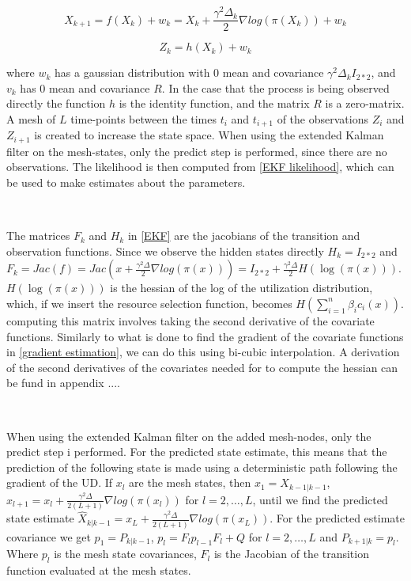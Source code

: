 $$X_{k+1} = f(X_k) + w_k = X_k + \frac{\gamma^2\Delta_k}{2}\nabla log(\pi(X_k)) + w_k$$

$$Z_k = h(X_k) + w_k$$

where $w_k$ has a gaussian distribution with $0$ mean and covariance $\gamma^2\Delta_k I_{2*2}$, and $v_k$ has $0$ mean and covariance $R$. In the case that the process is being observed directly the function $h$ is the identity function, and the matrix $R$ is a zero-matrix. A mesh of $L$ time-points between the times $t_i$ and $t_{i+1}$  of the observations $Z_i$ and $Z_{i+1}$ is created to increase the state space. When using the extended Kalman filter on the mesh-states, only the predict step is performed, since there are no observations. The likelihood is then computed from \ref{EKF likelihood}, which can be used to make estimates about the parameters. 

\

The matrices $F_k$ and $H_k$ in \ref{EKF} are the jacobians of the transition and observation functions. Since we observe the hidden states directly $H_k = I_{2*2}$ and $F_k = Jac(f) = Jac(x + \frac{\gamma^2 \Delta}{2}\nabla log(\pi(x))) = I_{2*2} + \frac{\gamma^2 \Delta}{2} H(\log(\pi(x)))$. $H(\log(\pi(x)))$ is the hessian of the log of the utilization distribution, which, if we insert the resource selection function, becomes $H(\sum_{i=1}^n \beta_i c_i(x))$. computing this matrix involves taking the second derivative of the covariate functions. Similarly to what is done to find the gradient of the covariate functions in \ref{gradient estimation}, we can do this using bi-cubic interpolation. A derivation of the second derivatives of the covariates needed for to compute the hessian can be fund in appendix ....

\

When using the extended Kalman filter on the added mesh-nodes, only the predict step i performed. For the predicted state estimate, this means that the prediction of the following state is made using a deterministic path following the gradient of the UD. If $x_l$ are the mesh states, then $x_1 = X_{k-1|k-1}$, $x_{l+1} = x_l + \frac{\gamma^2\Delta}{2(L+1)} \nabla log(\pi(x_l))$ for $l = 2, \dots, L$, until we find the predicted state estimate $\hat{X}_{k|k-1} = x_L + \frac{\gamma^2\Delta}{2(L+1)} \nabla log(\pi(x_L))$. For the predicted estimate covariance we get $p_1 = P_{k|k-1}$, $p_l = F_l p_{l-1} F_l + Q$ for $l=2, \dots, L$ and $P_{k+1|k} = p_l$. Where $p_l$ is the mesh state covariances, $F_l$ is the Jacobian of the transition function evaluated at the mesh states.

